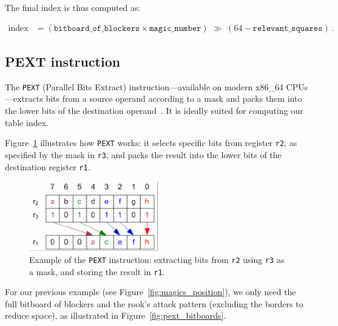 \vspace{1em}

\noindent The final index is thus computed as:

\begin{align*}
    \text{index}
    &= (\texttt{bitboard\_of\_blockers} \times \texttt{magic\_number})
       \;\gg\;(64 - \texttt{relevant\_squares})\,.
\end{align*}

\subsection{PEXT instruction}

\noindent The \texttt{PEXT} (Parallel Bits Extract) instruction—available on modern x86\_64 CPUs—extracts bits from a source operand according to a mask and packs them into the lower bits of the destination operand~\cite{PextInstruction}. It is ideally suited for computing our table index.

\noindent Figure~\ref{fig:pext_instruction_example} illustrates how \texttt{PEXT} works: it selects specific bits from register \texttt{r2}, as specified by the mask in \texttt{r3}, and packs the result into the lower bits of the destination register \texttt{r1}.

\begin{figure}[H]
    \centering
    \includegraphics[width=0.5\textwidth]{Imagenes/pext.png}
    \caption{Example of the \texttt{PEXT} instruction: extracting bits from \texttt{r2} using \texttt{r3} as a mask, and storing the result in \texttt{r1}. ~\cite{PextInstruction}}
    \label{fig:pext_instruction_example}
\end{figure}

\noindent For our previous example (see Figure~\ref{fig:magics_position}), we only need the full bitboard of blockers and the rook’s attack pattern (excluding the borders to reduce space), as illustrated in Figure~\ref{fig:pext_bitboards}.

